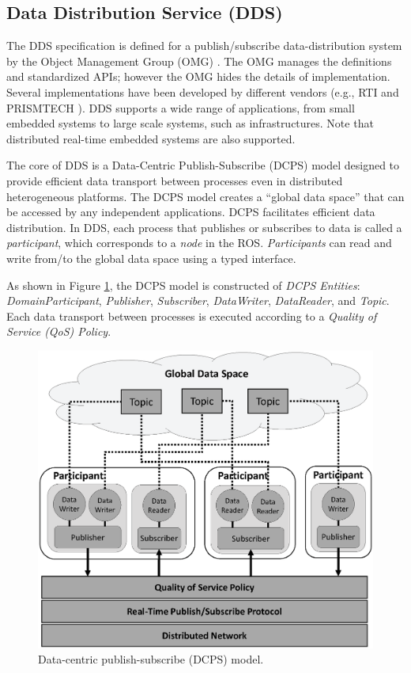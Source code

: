 \documentclass{sig-alternate-05-2015}
\begin{document}
\subsection{Data Distribution Service (DDS)}
\label{sec:orgheadline7}

The DDS specification \cite{dds1.4} is defined for a publish/subscribe data-distribution system by the Object Management Group (OMG) \cite{omg}. 
The OMG manages the definitions and standardized APIs; however the OMG hides the details of implementation. Several implementations have been developed by different vendors (e.g., RTI \cite{rti_connext} and PRISMTECH \cite{ospl_dds_community}).
DDS supports a wide range of applications, from small embedded systems to large scale systems, such as infrastructures. 
Note that distributed real-time embedded systems are also supported.

The core of DDS is a Data-Centric Publish-Subscribe (DCPS) model designed to provide efficient data transport between processes even in distributed heterogeneous platforms. 
The DCPS model creates a ``global data space'' that can be accessed by any independent applications. 
DCPS facilitates efficient data distribution.
In DDS, each process that publishes or subscribes to data is called a \emph{participant}, which corresponds to a \emph{node} in the ROS. 
\emph{Participants} can read and write from/to the global data space using a typed interface.

As shown in Figure \ref{fig:orgparagraph3}, the DCPS model is constructed of \emph{DCPS Entities}: \emph{DomainParticipant}, \emph{Publisher}, \emph{Subscriber}, \emph{DataWriter}, \emph{DataReader}, and \emph{Topic}. 
Each data transport between processes is executed according to a \emph{Quality of Service (QoS) Policy}.

\begin{figure}[t]
  \centering
  \includegraphics[width=0.7\linewidth]{../figure/DDS_model.eps}
  \vspace{-3mm}
  \caption{\label{fig:orgparagraph3}
    Data-centric publish-subscribe (DCPS) model.}
  \vspace{-5mm}
\end{figure}   
\end{document}
